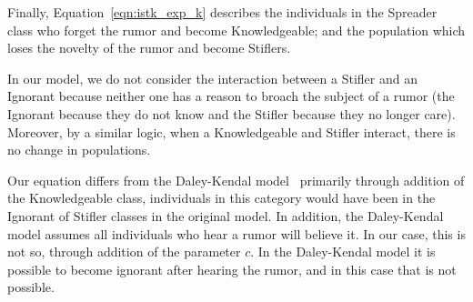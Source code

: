 Finally, Equation~\ref{eqn:istk_exp_k} describes the individuals in the Spreader class who forget the rumor and become Knowledgeable; and the population which loses the novelty of the rumor and become Stiflers.

In our model, we do not consider the interaction between a Stifler and an Ignorant because neither one has a reason to broach the subject of a rumor (the Ignorant because they do not know and the Stifler because they no longer care).
Moreover, by a similar logic, when a Knowledgeable and Stifler interact, there is no change in populations.


Our equation differs from the  Daley-Kendal model~\cite{daley-1965} primarily through addition of the Knowledgeable class, individuals in this category would have been in the Ignorant of Stifler classes in the original model.
In addition, the Daley-Kendal model assumes all individuals who hear a rumor will believe it.
In our case, this is not so, through addition of the parameter $ c $.
In the Daley-Kendal model it is possible to become ignorant after hearing the rumor, and in this case that is not possible.
